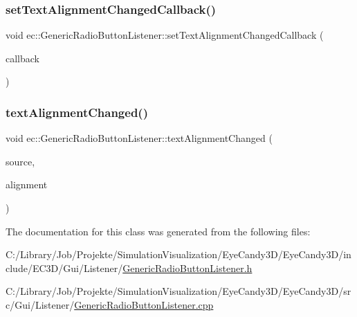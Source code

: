 \mbox{\label{classec_1_1_generic_radio_button_listener_a90c75e6db58773ab30347174e40d33ae}} 
\subsubsection{\texorpdfstring{set\+Text\+Alignment\+Changed\+Callback()}{setTextAlignmentChangedCallback()}}
{\footnotesize\ttfamily void ec\+::\+Generic\+Radio\+Button\+Listener\+::set\+Text\+Alignment\+Changed\+Callback (\begin{DoxyParamCaption}\item[{const \mbox{\hyperlink{classec_1_1_generic_radio_button_listener_a3e8ead6a08363f220625d2f856b9213d}{Text\+Alignment\+Changed\+\_\+\+Callback}} \&}]{callback }\end{DoxyParamCaption})}

\mbox{\label{classec_1_1_generic_radio_button_listener_a324705c5155f71e01104399b12a95b8f}} 
\subsubsection{\texorpdfstring{text\+Alignment\+Changed()}{textAlignmentChanged()}}
{\footnotesize\ttfamily void ec\+::\+Generic\+Radio\+Button\+Listener\+::text\+Alignment\+Changed (\begin{DoxyParamCaption}\item[{agui\+::\+Radio\+Button $\ast$}]{source,  }\item[{agui\+::\+Area\+Alignment\+Enum}]{alignment }\end{DoxyParamCaption})\hspace{0.3cm}{\ttfamily [override]}}



The documentation for this class was generated from the following files\+:\begin{DoxyCompactItemize}
\item 
C\+:/\+Library/\+Job/\+Projekte/\+Simulation\+Visualization/\+Eye\+Candy3\+D/\+Eye\+Candy3\+D/include/\+E\+C3\+D/\+Gui/\+Listener/\mbox{\hyperlink{_generic_radio_button_listener_8h}{Generic\+Radio\+Button\+Listener.\+h}}\item 
C\+:/\+Library/\+Job/\+Projekte/\+Simulation\+Visualization/\+Eye\+Candy3\+D/\+Eye\+Candy3\+D/src/\+Gui/\+Listener/\mbox{\hyperlink{_generic_radio_button_listener_8cpp}{Generic\+Radio\+Button\+Listener.\+cpp}}\end{DoxyCompactItemize}
